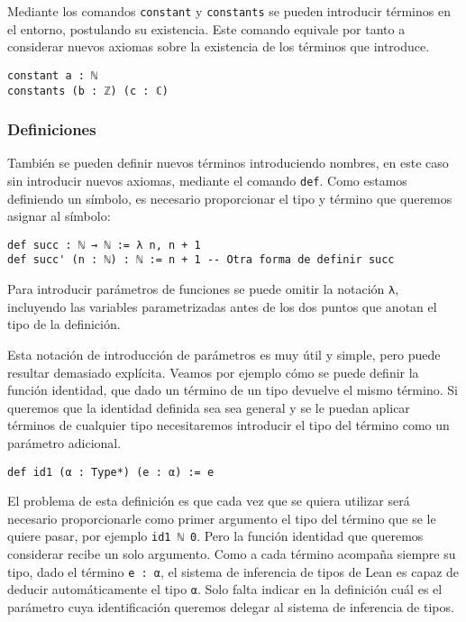 Mediante los comandos \lstinline{constant} y \lstinline{constants} se
pueden introducir términos en el entorno, postulando su existencia. Este comando
equivale por tanto a considerar nuevos axiomas sobre la existencia de los
términos que introduce.
\begin{lstlisting}
constant a : ℕ
constants (b : ℤ) (c : ℂ)
\end{lstlisting}


\subsubsection*{Definiciones}%

También se pueden definir nuevos términos introduciendo nombres, en este caso
sin introducir nuevos axiomas, mediante el comando \lstinline{def}. Como estamos
definiendo un símbolo, es necesario proporcionar el tipo y término que queremos
asignar al símbolo:

\begin{lstlisting}
def succ : ℕ → ℕ := λ n, n + 1
def succ' (n : ℕ) : ℕ := n + 1 -- Otra forma de definir succ
\end{lstlisting}

Para introducir parámetros de funciones se puede omitir la notación
\lstinline{λ}, incluyendo las variables parametrizadas antes de los dos puntos
que anotan el tipo de la definición.

Esta notación de introducción de parámetros es muy útil y simple, pero puede
resultar demasiado explícita. Veamos por ejemplo cómo se puede definir la
función identidad, que dado un término de un tipo devuelve el mismo término.
Si queremos que la identidad definida sea sea general y se le puedan aplicar términos
de cualquier tipo necesitaremos introducir el tipo del término como un parámetro
adicional.

\begin{lstlisting}
def id1 (α : Type*) (e : α) := e
\end{lstlisting}

El problema de esta definición es que cada vez que se quiera utilizar será
necesario proporcionarle como primer argumento el tipo del término que se le
quiere pasar, por ejemplo \lstinline{id1 ℕ 0}.
Pero la función identidad que queremos considerar recibe un solo argumento.
Como a cada término acompaña siempre su tipo, dado el término \lstinline{e : α},
el sistema de inferencia de tipos de Lean es capaz de deducir automáticamente el
tipo \lstinline{α}. Solo falta indicar en la definición cuál es el parámetro
cuya identificación queremos delegar al sistema de inferencia de tipos.

